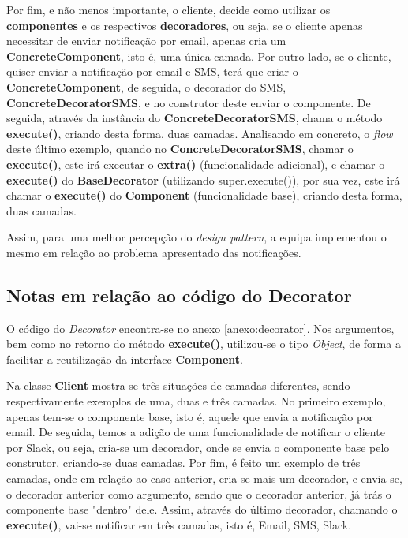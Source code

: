 Por fim, e não menos importante, o cliente, decide como utilizar os \textbf{componentes} e os respectivos \textbf{decoradores}, ou seja, se o cliente apenas necessitar de enviar notificação por email, apenas cria um \textbf{ConcreteComponent}, isto é, uma única camada. Por outro lado, se o cliente, quiser enviar a notificação por email e SMS, terá que criar o \textbf{ConcreteComponent}, de seguida, o decorador do SMS, \textbf{ConcreteDecoratorSMS}, e no construtor deste enviar o componente. De seguida, através da instância do \textbf{ConcreteDecoratorSMS}, chama o método \textbf{execute()}, criando desta forma, duas camadas. Analisando em concreto, o \textit{flow} deste último exemplo, quando no \textbf{ConcreteDecoratorSMS}, chamar o \textbf{execute()}, este irá executar o \textbf{extra()} (funcionalidade adicional), e chamar o \textbf{execute()} do \textbf{BaseDecorator} (utilizando super.execute()), por sua vez, este irá chamar o \textbf{execute()} do \textbf{Component} (funcionalidade base), criando desta forma, duas camadas.

Assim, para uma melhor percepção do \textit{design pattern}, a equipa implementou o mesmo em relação ao problema apresentado das notificações.

\subsection{Notas em relação ao código do Decorator}
\hspace{3mm} O código do \textit{Decorator} encontra-se no anexo \ref{anexo:decorator}. Nos argumentos, bem como no retorno do método \textbf{execute()}, utilizou-se o tipo \textit{Object}, de forma a facilitar a reutilização da interface \textbf{Component}. 

Na classe \textbf{Client} mostra-se três situações de camadas diferentes, sendo respectivamente exemplos de uma, duas e três camadas. No primeiro exemplo, apenas tem-se o componente base, isto é, aquele que envia a notificação por email. De seguida, temos a adição de uma funcionalidade de notificar o cliente por Slack, ou seja, cria-se um decorador, onde se envia o componente base pelo construtor, criando-se duas camadas. Por fim, é feito um exemplo de três camadas, onde em relação ao caso anterior, cria-se mais um decorador, e envia-se, o decorador anterior como argumento, sendo que o decorador anterior, já trás o componente base "dentro" dele. Assim, através do último decorador, chamando o \textbf{execute()}, vai-se notificar em três camadas, isto é, Email, SMS, Slack. 
